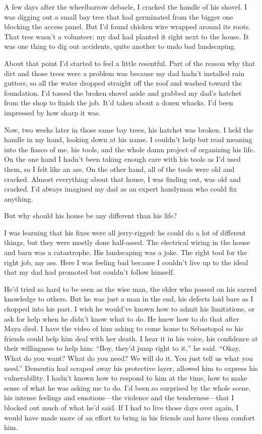 \documentclass[12pt]{book}
\begin{document}
A few days after the wheelbarrow debacle, I cracked the handle of his shovel. I was digging out a small bay tree that had germinated from the bigger one blocking the access panel. But I'd found chicken wire wrapped around its roots. That tree wasn't a volunteer: my dad had planted it right next to the house. It was one thing to dig out accidents, quite another to undo bad landscaping.

About that point I'd started to feel a little resentful. Part of the reason why that dirt and those trees were a problem was because my dad hadn't installed rain gutters, so all the water dropped straight off the roof and washed toward the foundation. I'd tossed the broken shovel aside and grabbed my dad's hatchet from the shop to finish the job. It'd taken about a dozen whacks. I'd been impressed by how sharp it was.

Now, two weeks later in those same bay trees, his hatchet was broken. I held the handle in my hand, looking down at his name. I couldn't help but read meaning into the fiasco of me, his tools, and the whole damn project of organizing his life. On the one hand I hadn't been taking enough care with his tools as I'd used them, so I felt like an ass. On the other hand, all of the tools were old and cracked. Almost everything about that house, I was finding out, was old and cracked. I'd always imagined my dad as an expert handyman who could fix anything.

But why should his house be any different than his life?

I was learning that his fixes were all jerry-rigged: he could do a lot of different things, but they were mostly done half-assed. The electrical wiring in the house and barn was a catastrophe. His landscaping was a joke. The right tool for the right job, my ass. Here I was feeling bad because I couldn't live up to the ideal that my dad had promoted but couldn't follow himself.

He'd tried so hard to be seen as the wise man, the elder who passed on his sacred knowledge to others. But he was just a man in the end, his defects laid bare as I chopped into his past. I wish he would've known how to admit his limitations, or ask for help when he didn't know what to do. He knew how to do that after Maya died. I have the video of him asking to come home to Sebastopol so his friends could help him deal with her death. I hear it in his voice, his confidence at their willingness to help him: ``Boy, they'd jump right to it,'' he said. ``Okay, What do you want? What do you need? We will do it. You just tell us what you need.'' Dementia had scraped away his protective layer, allowed him to express his vulnerability. I hadn't known how to respond to him at the time, how to make sense of what he was asking me to do. I'd been so surprised by the whole scene, his intense feelings and emotions---the violence and the tenderness---that I blocked out much of what he'd said. If I had to live those days over again, I would have made more of an effort to bring in his friends and have them comfort him.
\end{document}

